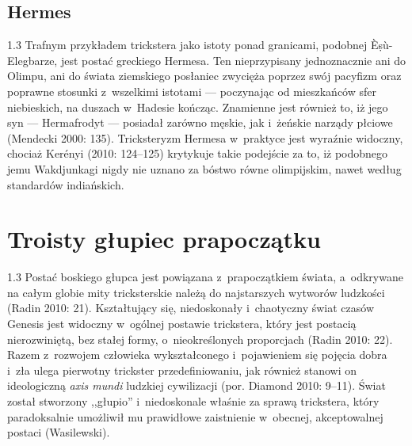 \documentclass[11pt,a4paper,twoside]{report}
\begin{document}
\section{Hermes}
\begin{spacing}{1.3}
Trafnym przykładem trickstera jako istoty ponad granicami, podobnej \`{E}\d{s}\`{u}-Elegba\-rze, jest postać greckiego Hermesa. Ten nieprzypisany jednoznacznie ani do Olimpu, ani do świata ziemskiego posłaniec zwycięża poprzez swój pacyfizm oraz poprawne stosunki z~wszelkimi istotami --- poczynając od mieszkańców sfer niebieskich, na duszach w~Hadesie kończąc. Znamienne jest również to, iż jego syn --- Hermafrodyt --- posiadał zarówno męskie, jak i~żeńskie narządy płciowe (Mendecki 2000: 135). Tricksteryzm Hermesa w~praktyce jest wyraźnie widoczny, chociaż Kerényi (2010: 124--125) krytykuje takie podejście za to, iż podobnego jemu Wakdjunkagi nigdy nie uznano za bóstwo równe olimpijskim, nawet według standardów indiańskich.
\end{spacing}

\vspace*{1\baselineskip}
\chapter{Troisty głupiec prapoczątku}
\begin{spacing}{1.3}
Postać boskiego głupca jest powiązana z~prapoczątkiem świata, a~odkrywane na całym globie mity tricksterskie należą do najstarszych wytworów ludzkości (Radin 2010: 21). Kształtujący się, niedoskonały i~chaotyczny świat czasów Genesis jest widoczny w~ogólnej postawie trickstera, który jest postacią nierozwiniętą, bez stałej formy, o~nieokreślonych proporcjach (Radin 2010: 22). Razem z~rozwojem człowieka wykształconego i~pojawieniem się pojęcia dobra i~zła ulega pierwotny trickster przedefiniowaniu, jak również stanowi on ideologiczną \emph{axis mundi} ludzkiej cywilizacji (por. Diamond 2010: 9--11). Świat został stworzony ,,głupio'' i~niedoskonale właśnie za sprawą trickstera, który paradoksalnie umożliwił mu prawidłowe zaistnienie w~obecnej, akceptowalnej postaci (Wasilewski).
\end{spacing}

\pagebreak
\vspace*{1\baselineskip}
\end{document}
